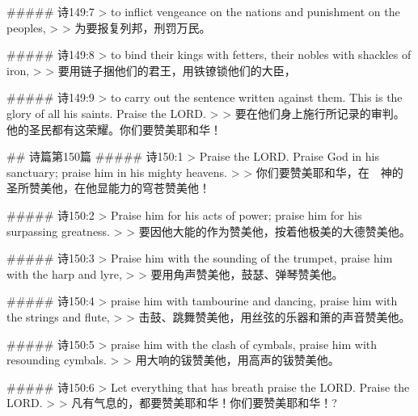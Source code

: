 ##### 诗149:7
> to inflict vengeance on the nations and punishment on the peoples,
>
> 为要报复列邦，刑罚万民。


##### 诗149:8
> to bind their kings with fetters, their nobles with shackles of iron,
>
> 要用链子捆他们的君王，用铁镣锁他们的大臣，


##### 诗149:9
> to carry out the sentence written against them. This is the glory of all his saints. Praise the LORD.
>
> 要在他们身上施行所记录的审判。他的圣民都有这荣耀。你们要赞美耶和华！


## 诗篇第150篇
##### 诗150:1
> Praise the LORD. Praise God in his sanctuary; praise him in his mighty heavens.
>
> 你们要赞美耶和华，在　神的圣所赞美他，在他显能力的穹苍赞美他！


##### 诗150:2
> Praise him for his acts of power; praise him for his surpassing greatness.
>
> 要因他大能的作为赞美他，按着他极美的大德赞美他。


##### 诗150:3
> Praise him with the sounding of the trumpet, praise him with the harp and lyre,
>
> 要用角声赞美他，鼓瑟、弹琴赞美他。


##### 诗150:4
> praise him with tambourine and dancing, praise him with the strings and flute,
>
> 击鼓、跳舞赞美他，用丝弦的乐器和箫的声音赞美他。


##### 诗150:5
> praise him with the clash of cymbals, praise him with resounding cymbals.
>
> 用大响的钹赞美他，用高声的钹赞美他。


##### 诗150:6
> Let everything that has breath praise the LORD. Praise the LORD.
>
> 凡有气息的，都要赞美耶和华！你们要赞美耶和华！?

